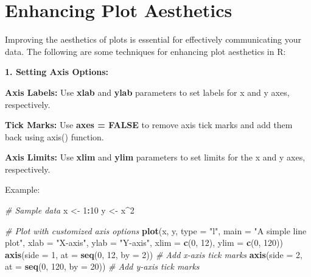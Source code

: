 \documentclass[
]{book}
\newenvironment{Shaded}{\begin{snugshade}}{\end{snugshade}}
\newcommand{\AttributeTok}[1]{\textcolor[rgb]{0.13,0.29,0.53}{#1}}
\newcommand{\CommentTok}[1]{\textcolor[rgb]{0.56,0.35,0.01}{\textit{#1}}}
\newcommand{\DecValTok}[1]{\textcolor[rgb]{0.00,0.00,0.81}{#1}}
\newcommand{\FunctionTok}[1]{\textcolor[rgb]{0.13,0.29,0.53}{\textbf{#1}}}
\newcommand{\NormalTok}[1]{#1}
\newcommand{\OtherTok}[1]{\textcolor[rgb]{0.56,0.35,0.01}{#1}}
\newcommand{\SpecialCharTok}[1]{\textcolor[rgb]{0.81,0.36,0.00}{\textbf{#1}}}
\newcommand{\StringTok}[1]{\textcolor[rgb]{0.31,0.60,0.02}{#1}}
\begin{document}
\section{Enhancing Plot Aesthetics}\label{enhancing-plot-aesthetics}

Improving the aesthetics of plots is essential for effectively communicating your data. The following are some techniques for enhancing plot aesthetics in R:

\textbf{1. Setting Axis Options:}

\textbf{Axis Labels:} Use \textbf{xlab} and \textbf{ylab} parameters to set labels for x and y axes, respectively.

\textbf{Tick Marks:} Use \textbf{axes = FALSE} to remove axis tick marks and add them back using axis() function.

\textbf{Axis Limits:} Use \textbf{xlim} and \textbf{ylim} parameters to set limits for the x and y axes, respectively.

Example:

\begin{Shaded}
\begin{Highlighting}[]
\CommentTok{\# Sample data}
\NormalTok{x }\OtherTok{\textless{}{-}} \DecValTok{1}\SpecialCharTok{:}\DecValTok{10}
\NormalTok{y }\OtherTok{\textless{}{-}}\NormalTok{ x}\SpecialCharTok{\^{}}\DecValTok{2}

\CommentTok{\# Plot with customized axis options}
\FunctionTok{plot}\NormalTok{(x, y, }\AttributeTok{type =} \StringTok{"l"}\NormalTok{, }\AttributeTok{main =} \StringTok{"A simple line plot"}\NormalTok{, }\AttributeTok{xlab =} \StringTok{"X{-}axis"}\NormalTok{, }\AttributeTok{ylab =} \StringTok{"Y{-}axis"}\NormalTok{, }\AttributeTok{xlim =} \FunctionTok{c}\NormalTok{(}\DecValTok{0}\NormalTok{, }\DecValTok{12}\NormalTok{), }\AttributeTok{ylim =} \FunctionTok{c}\NormalTok{(}\DecValTok{0}\NormalTok{, }\DecValTok{120}\NormalTok{))}
\FunctionTok{axis}\NormalTok{(}\AttributeTok{side =} \DecValTok{1}\NormalTok{, }\AttributeTok{at =} \FunctionTok{seq}\NormalTok{(}\DecValTok{0}\NormalTok{, }\DecValTok{12}\NormalTok{, }\AttributeTok{by =} \DecValTok{2}\NormalTok{)) }\CommentTok{\# Add x{-}axis tick marks}
\FunctionTok{axis}\NormalTok{(}\AttributeTok{side =} \DecValTok{2}\NormalTok{, }\AttributeTok{at =} \FunctionTok{seq}\NormalTok{(}\DecValTok{0}\NormalTok{, }\DecValTok{120}\NormalTok{, }\AttributeTok{by =} \DecValTok{20}\NormalTok{)) }\CommentTok{\# Add y{-}axis tick marks}
\end{Highlighting}
\end{Shaded}
\end{document}
